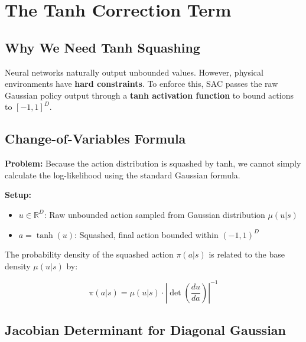 \documentclass[12pt,a4paper]{article}
\theoremstyle{noteplain}
\theoremstyle{noteexercise}
\begin{document}


\section{The Tanh Correction Term}\label{sec:tanh}



\subsection{Why We Need Tanh Squashing}\label{ssec:tanh-why}



Neural networks naturally output unbounded values. However, physical environments have \textbf{hard constraints}. To enforce this, SAC passes the raw Gaussian policy output through a \textbf{tanh activation function} to bound actions to $[-1, 1]^D$.



\subsection{Change-of-Variables Formula}\label{ssec:change-var}



\textbf{Problem:} Because the action distribution is squashed by tanh, we cannot simply calculate the log-likelihood using the standard Gaussian formula.

\textbf{Setup:}
\begin{itemize}
  \item $u \in \mathbb{R}^D$: Raw unbounded action sampled from Gaussian distribution $\mu(u|s)$
  \item $a = \tanh(u)$: Squashed, final action bounded within $(-1, 1)^D$
\end{itemize}

The probability density of the squashed action $\pi(a|s)$ is related to the base density $\mu(u|s)$ by:

$$\pi(a|s) = \mu(u|s) \cdot \left|\det\left(\frac{du}{da}\right)\right|^{-1}$$



\subsection{Jacobian Determinant for Diagonal Gaussian}\label{ssec:jacobian}
\end{document}
